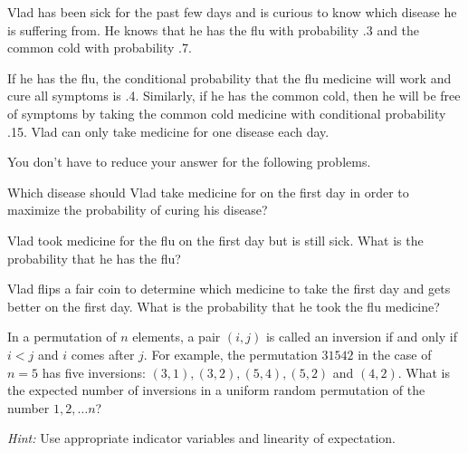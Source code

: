 \documentclass[12pt,twoside]{article}
\begin{document}
\newpage

\begin{problem}{15}
Vlad has been sick for the past few days and is curious to know which disease he is suffering from.  He knows that he has the flu with probability .3 and the common cold with probability .7.

If he has the flu, the conditional probability that the flu medicine will work and cure all symptoms is .4.  Similarly, if he has the common cold, then he will be free of symptoms by taking the common cold medicine with conditional probability .15. Vlad can only take medicine for one disease each day.

You don't have to reduce your answer for the following problems.

\bparts
{}  Which disease should Vlad take medicine for on the first day in order to maximize the probability of curing his disease?


  Vlad took medicine for the flu on the first day but is still sick.  What is the probability that he has the flu?


  Vlad flips a fair coin to determine which medicine to take the first day and gets better on the first day.  What is the probability that he took the flu medicine?



\eparts
\end{problem}

\newpage

\begin{problem}{10}
In a permutation of $n$ elements, a pair $(i, j)$ is called an inversion if and only if $i < j$ and $i$ comes after $j$.  For example, the permutation $31542$ in the case of $n = 5$ has five inversions: $(3, 1), (3, 2), (5, 4), (5, 2)$ and $(4, 2)$. What is the expected number of inversions in a uniform random permutation of the number $1, 2, \ldots n$?

\textit{Hint:} Use appropriate indicator variables and linearity of expectation.
\end{problem}
\end{document}
